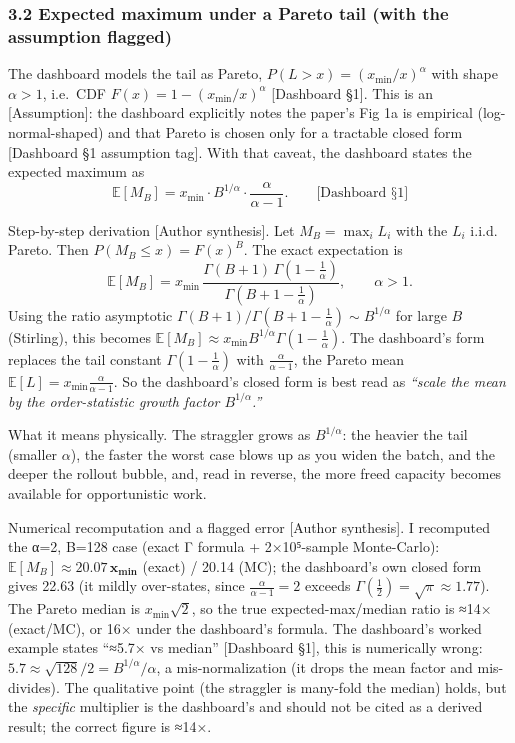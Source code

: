 \documentclass[
  11pt,
  letterpaper,
]{article}
\begin{document}
\subsubsection{3.2 Expected maximum under a Pareto tail (with the
assumption
flagged)}\label{expected-maximum-under-a-pareto-tail-with-the-assumption-flagged}

The dashboard models the tail as Pareto,
\(P(L>x) = (x_{\min}/x)^{\alpha}\) with shape \(\alpha>1\), i.e.~CDF
\(F(x)=1-(x_{\min}/x)^{\alpha}\) {[}Dashboard §1{]}. This is an
{[}Assumption{]}: the dashboard explicitly notes the paper's Fig 1a is
empirical (log-normal-shaped) and that Pareto is chosen only for a
tractable closed form {[}Dashboard §1 assumption tag{]}. With that
caveat, the dashboard states the expected maximum as
\[\mathbb{E}[M_B] = x_{\min}\cdot B^{1/\alpha}\cdot\frac{\alpha}{\alpha-1}.\qquad\text{[Dashboard §1]}\]

Step-by-step derivation {[}Author synthesis{]}. Let \(M_B=\max_i L_i\)
with the \(L_i\) i.i.d. Pareto. Then \(P(M_B\le x)=F(x)^B\). The exact
expectation is
\[\mathbb{E}[M_B] = x_{\min}\,\frac{\Gamma(B+1)\,\Gamma\!\left(1-\tfrac{1}{\alpha}\right)}{\Gamma\!\left(B+1-\tfrac{1}{\alpha}\right)},\qquad \alpha>1.\]
Using the ratio asymptotic
\(\Gamma(B+1)/\Gamma(B+1-\tfrac{1}{\alpha})\sim B^{1/\alpha}\) for large
\(B\) (Stirling), this becomes
\(\mathbb{E}[M_B]\approx x_{\min}B^{1/\alpha}\Gamma(1-\tfrac1\alpha)\).
The dashboard's form replaces the tail constant
\(\Gamma(1-\tfrac1\alpha)\) with \(\tfrac{\alpha}{\alpha-1}\), the
Pareto mean \(\mathbb{E}[L]=x_{\min}\tfrac{\alpha}{\alpha-1}\). So the
dashboard's closed form is best read as \emph{``scale the mean by the
order-statistic growth factor \(B^{1/\alpha}\).''}

What it means physically. The straggler grows as \(B^{1/\alpha}\): the
heavier the tail (smaller \(\alpha\)), the faster the worst case blows
up as you widen the batch, and the deeper the rollout bubble, and, read
in reverse, the more freed capacity becomes available for opportunistic
work.

Numerical recomputation and a flagged error {[}Author synthesis{]}. I
recomputed the α=2, B=128 case (exact Γ formula + 2×10⁵-sample
Monte-Carlo): \(\mathbb{E}[M_B]\approx\mathbf{20.07\,x_{\min}}\) (exact)
/ 20.14 (MC); the dashboard's own closed form gives 22.63 (it mildly
over-states, since \(\tfrac{\alpha}{\alpha-1}=2\) exceeds
\(\Gamma(\tfrac12)=\sqrt\pi\approx1.77\)). The Pareto median is
\(x_{\min}\sqrt2\), so the true expected-max/median ratio is ≈14×
(exact/MC), or 16× under the dashboard's formula. The dashboard's worked
example states ``≈5.7× vs median'' {[}Dashboard §1{]}, this is
numerically wrong: \(5.7\approx\sqrt{128}/2=B^{1/\alpha}/\alpha\), a
mis-normalization (it drops the mean factor and mis-divides). The
qualitative point (the straggler is many-fold the median) holds, but the
\emph{specific} multiplier is the dashboard's and should not be cited as
a derived result; the correct figure is ≈14×.
\end{document}
